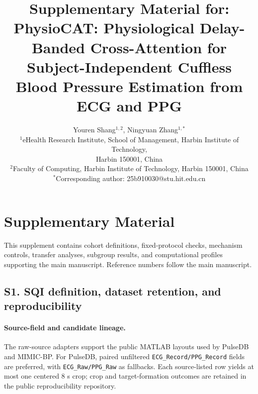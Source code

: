 \documentclass[11pt]{article}
\title{\textbf{Supplementary Material for: PhysioCAT: Physiological Delay-Banded Cross-Attention for Subject-Independent Cuffless Blood Pressure Estimation from ECG and PPG}}
\author{Youren Shang$^{1,2}$, Ningyuan Zhang$^{1,*}$\\
\small $^{1}$eHealth Research Institute, School of Management, Harbin Institute of Technology,\\
\small Harbin 150001, China\\
\small $^{2}$Faculty of Computing, Harbin Institute of Technology, Harbin 150001, China\\
\small $^{*}$Corresponding author: 25b910030@stu.hit.edu.cn}
\date{}
\begin{document}
\maketitle

\appendix
\setcounter{table}{0}
\setcounter{figure}{0}
\renewcommand{\thetable}{S\arabic{table}}
\renewcommand{\thefigure}{S\arabic{figure}}

\section*{Supplementary Material}

This supplement contains cohort definitions, fixed-protocol checks, mechanism controls, transfer analyses, subgroup results, and computational profiles supporting the main manuscript. Reference numbers follow the main manuscript.

\subsection*{S1. SQI definition, dataset retention, and reproducibility}

\paragraph{Source-field and candidate lineage.}
The raw-source adapters support the public MATLAB layouts used by PulseDB and MIMIC-BP. For PulseDB, paired unfiltered \texttt{ECG\_Record/PPG\_Record} fields are preferred, with \texttt{ECG\_Raw/PPG\_Raw} as fallbacks. Each source-listed row yields at most one centered 8 s crop; crop and target-formation outcomes are retained in the public reproducibility repository.
\end{document}
